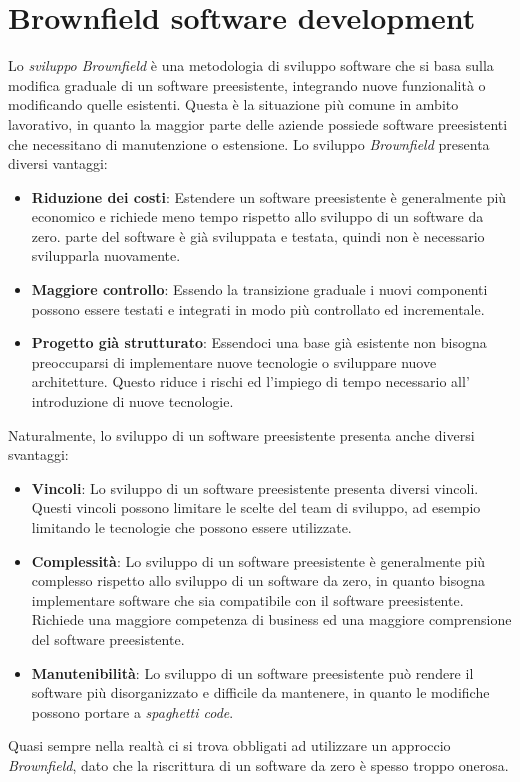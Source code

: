 \section{Brownfield software development}
\label{sec:brownfield}
Lo \textit{sviluppo Brownfield} è una metodologia di sviluppo software che si basa sulla modifica graduale di un software preesistente, integrando nuove funzionalità o modificando quelle esistenti.
Questa è la situazione più comune in ambito lavorativo, in quanto la maggior parte delle aziende possiede software preesistenti che necessitano di manutenzione o estensione.
Lo sviluppo \textit{Brownfield} presenta diversi vantaggi:
\begin{itemize}
    \item \textbf{Riduzione dei costi}: Estendere un software preesistente è generalmente più economico e richiede meno tempo rispetto allo sviluppo di un software da zero.
    parte del software è già sviluppata e testata, quindi non è necessario svilupparla nuovamente.
    \item \textbf{Maggiore controllo}: Essendo la transizione graduale i nuovi componenti possono essere testati e integrati in modo più controllato ed incrementale.
    \item \textbf{Progetto già strutturato}: Essendoci una base già esistente non bisogna preoccuparsi di implementare nuove tecnologie o sviluppare nuove architetture.
    Questo riduce i rischi ed l'impiego di tempo necessario all' introduzione di nuove tecnologie.
\end{itemize} 
Naturalmente, lo sviluppo di un software preesistente presenta anche diversi svantaggi:
\begin{itemize}
    \item \textbf{Vincoli}: Lo sviluppo di un software preesistente presenta diversi vincoli.
    Questi vincoli possono limitare le scelte del team di sviluppo, ad esempio limitando le tecnologie che possono essere utilizzate.
    \item \textbf{Complessità}: Lo sviluppo di un software preesistente è generalmente più complesso rispetto allo sviluppo di un software da zero, in quanto bisogna implementare software che sia
    compatibile con il software preesistente. Richiede una maggiore competenza di business ed una maggiore comprensione del software preesistente.
    \item \textbf{Manutenibilità}: Lo sviluppo di un software preesistente può rendere il software più disorganizzato e difficile da mantenere, in quanto le modifiche possono portare a \textit{spaghetti code}.
\end{itemize}
Quasi sempre nella realtà ci si trova obbligati ad utilizzare un approccio \textit{Brownfield}, dato che la riscrittura di un software da zero è spesso troppo onerosa.

